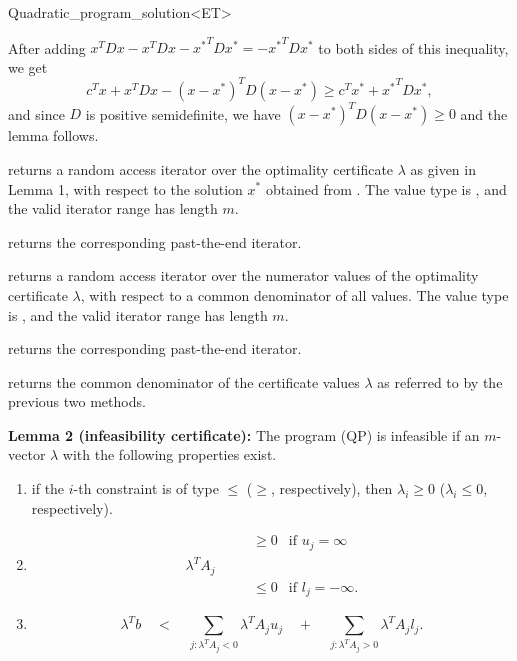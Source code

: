 \begin{ccRefClass}{Quadratic_program_solution<ET>}
\begin{ccAdvanced}
After adding $x^TDx - x^TDx - {x^*}^TDx^* = -{x^*}^TDx^*$ to both sides of
this inequality, we get
\[
c^Tx + x^TDx - (x-x^*)^TD(x-x^*) \geq c^Tx^* + {x^*}^TDx^*,
\] 
and since $D$ is positive semidefinite, we have
$(x-x^*)^TD(x-x^*)\geq 0$ and the lemma follows.
\end{ccAdvanced}

{returns a random access iterator over the optimality certificate 
$\lambda$ as given in Lemma 1, with respect to the solution $x^*$ 
obtained from \ccVar{}. The value type
is , and the valid iterator range has length $m$.
\ccPrecond \ccVar{}}

{returns the corresponding past-the-end iterator.}

{returns a random access iterator over the numerator values
of the optimality certificate $\lambda$, with respect to a 
common denominator of all values. The value type
is , and the valid iterator range has length $m$.}

{returns the corresponding past-the-end iterator.}

{returns the common denominator of the certificate values 
$\lambda$ as referred to by the previous two methods.}

{\bf Lemma 2 (infeasibility certificate):} The program (QP) is
infeasible if an $m$-vector $\lambda$ with the
following properties exist.
\begin{enumerate}
\item if the $i$-th constraint is of type $\leq$ ($\geq$, respectively), 
then $\lambda_i\geq 0$ ($\lambda_i\leq 0$, respectively).
\item 
\[
\begin{array}{llll}
&&\geq 0 & \mbox{if $u_j=\infty$} \\
\lambda^T A_j &\quad  \\
&&\leq 0 & \mbox{if $l_j=-\infty$.}
\end{array}
\]
\item \[\lambda^Tb \quad<\quad \sum_{j: \lambda^TA_j <0} \lambda^TA_j u_j 
\quad+\quad  \sum_{j: \lambda^TA_j >0} \lambda^TA_j l_j.\]
\end{enumerate}


\end{ccRefClass}
